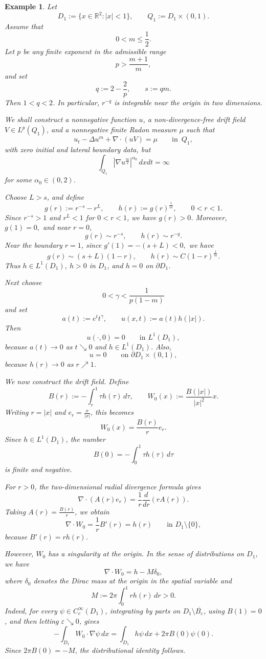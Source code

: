 \documentclass{amsart}
\newtheorem{example}[defn]{Example}
\numberwithin{equation}{section}
\begin{document}
\begin{example}
\label{ex:non-divfree-counterexample}
Let
\[
D_1:=\{x\in\mathbb R^2: |x|<1\},
\qquad
Q_1:=D_1\times(0,1).
\]
Assume that
\[
0<m\le \frac{1}{2}.
\]
Let \(p\) be any finite exponent in the admissible range
\[
p>\frac{m+1}{m},
\]
and set
\[
q:=2-\frac{2}{p},
\qquad
s:=qm.
\]
Then \(1<q<2\). In particular, \(r^{-q}\) is integrable near the origin in
two dimensions.

We shall construct a nonnegative function \(u\), a non-divergence-free drift
field \(V\in L^p(Q_1)\), and a nonnegative finite Radon measure
\(\mu\) such that
\[
u_t-\Delta u^m+\nabla\cdot(uV)=\mu
\qquad
\text{in } \, Q_1,
\]
with zero initial and lateral boundary data, but
\[
\int_{Q_1}
\left|\nabla u^{\frac{m}{2}}\right|^{\alpha_0}\,dxdt
=
\infty
\]
for some \(\alpha_0\in(0,2)\).

Choose \(L>s\), and define
\[
g(r):=r^{-s}-r^L,
\qquad
h(r):=g(r)^{\frac{1}{m}},
\qquad
0<r<1.
\]
Since \(r^{-s}>1\) and \(r^L<1\) for \(0<r<1\), we have \(g(r)>0\).
Moreover,
\(
g(1)=0,
\)
and near \(r=0\),
\[
g(r)\sim r^{-s},
\qquad
h(r)\sim r^{-q}.
\]
Near the boundary \(r=1\), since
\(
g'(1)=-(s+L)<0,
\)
we have
\[
g(r)\sim (s+L)(1-r),
\qquad
h(r)\sim C(1-r)^{\frac{1}{m}}.
\]
Thus \(h\in L^1(D_1)\), \(h>0\) in \(D_1\), and \(h=0\) on \(\partial D_1\).

Next choose
\[
0<\gamma<\frac{1}{p(1-m)}
\]
and set
\[
a(t):=e^t t^\gamma,
\qquad
u(x,t):=a(t)h(|x|).
\]
Then
\[
u(\cdot,0)=0
\qquad
\text{in }L^1(D_1),
\]
because \(a(t)\to0\) as \(t\searrow0\) and \(h\in L^1(D_1)\). Also,
\[
u=0
\qquad
\text{on }\partial D_1\times(0,1),
\]
because \(h(r)\to0\) as \(r\nearrow1\).

We now construct the drift field. Define
\[
B(r):=-\int_r^1 \tau h(\tau)\,d\tau,
\qquad
W_0(x):=\frac{B(|x|)}{|x|^2}x.
\]
Writing \(r=|x|\) and \(e_r=\frac{x}{|x|}\), this becomes
\[
W_0(x)=\frac{B(r)}{r}e_r.
\]
Since \(h\in L^1(D_1)\), the number
\[
B(0)=-\int_0^1 \tau h(\tau)\,d\tau
\]
is finite and negative.

For \(r>0\), the two-dimensional radial divergence formula gives
\[
\nabla\cdot(A(r)e_r)
=
\frac{1}{r}\frac{d}{dr}\left(rA(r)\right).
\]
Taking \(A(r)=\frac{B(r)}{r}\), we obtain
\[
\nabla\cdot W_0
=
\frac{1}{r} B'(r)
=
h(r)
\qquad
\text{in }D_1\setminus\{0\},
\]
because \(B'(r)=rh(r)\).

However, \(W_0\) has a singularity at the origin. In the sense of
distributions on \(D_1\), we have
\[
\nabla\cdot W_0=h-M\delta_0,
\]
where \(\delta_0\) denotes the Dirac mass at the origin in the spatial variable and 
\[
M:=2\pi\int_0^1 r h(r)\,dr>0.
\]
Indeed, for every \(\psi\in C_c^\infty(D_1)\), integrating by parts on
\(D_1\setminus\overline{B_\varepsilon}\), using \(B(1)=0\), and then
letting \(\varepsilon\searrow0\), gives
\[
-\int_{D_1}W_0\cdot\nabla\psi\,dx
=
\int_{D_1}h\psi\,dx
+
2\pi B(0)\psi(0).
\]
Since \(2\pi B(0)=-M\), the distributional identity follows.


\end{example}
\end{document}
